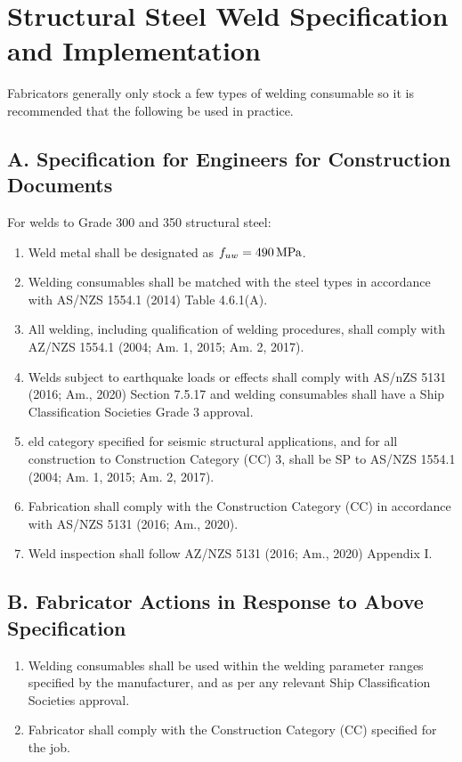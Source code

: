 \chapter{Structural Steel Weld Specification and Implementation}
Fabricators generally only stock a few types of welding consumable so it is recommended that the following be used in practice.
\section*{A. Specification for Engineers for Construction Documents}
For welds to Grade 300 and 350 structural steel:
\begin{enumerate}
\item Weld metal shall be designated as $f_{uw}=\SI{490}{\mega\pascal}$.
\item Welding consumables shall be matched with the steel types in accordance with AS/NZS 1554.1 (2014) Table 4.6.1(A).
\item All welding, including qualification of welding procedures, shall comply with AZ/NZS 1554.1 (2004; Am. 1, 2015; Am. 2, 2017).
\item Welds subject to earthquake loads or effects shall comply with AS/nZS 5131 (2016; Am., 2020) Section 7.5.17 and welding consumables shall have a Ship Classification Societies Grade 3 approval.
\item eld category specified for seismic structural applications, and for all construction to Construction Category (CC) 3, shall be SP to AS/NZS 1554.1 (2004; Am. 1, 2015; Am. 2, 2017).
\item Fabrication shall comply with the Construction Category (CC) in accordance with AS/NZS 5131 (2016; Am., 2020).
\item Weld inspection shall follow AZ/NZS 5131 (2016; Am., 2020) Appendix I.
\end{enumerate}
\section*{B. Fabricator Actions in Response to Above Specification}
\begin{enumerate}
\item Welding consumables shall be used within the welding parameter ranges specified by the manufacturer, and as per any relevant Ship Classification Societies approval.
\item Fabricator shall comply with the Construction Category (CC) specified for the job.
\end{enumerate}
